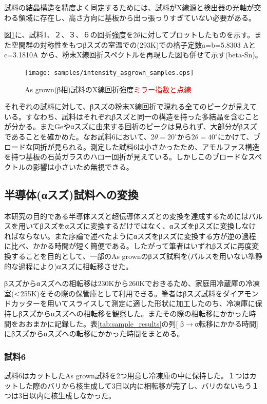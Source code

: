 試料の結晶構造を精度よく同定するためには、試料がX線源と検出器の光軸が交わる領域に存在し、高さ方向に基板から出っ張っりすぎていない必要がある。

図\ref{fig:intensity_asgrown_samples}に、試料1、２、３、６の回折強度を$2\theta$に対してプロットしたものを示す。また空間群の対称性をもつβスズの室温での(293K)での格子定数a=b=5.8303 Aとc=3.1810A \cite{Wolcyrz}から、粉末X線回折スペクトルを再現した図も併せて示す(beta-Sn)。
\begin{figure}[!h]
    \begin{center}
   \texttt{[image: samples/intensity\_asgrown\_samples.eps]}
  \end{center}
  \caption{As grown(β相)試料のX線回折強度\textcolor{red}{ミラー指数と点線}}
  \label{fig:intensity_asgrown_samples}
\end{figure}

それぞれの試料に対して、βスズの粉末X線回折で現れる全てのピークが見えている。すなわち、試料はそれぞれβスズと同一の構造を持った多結晶を含むことが分かる。またGeやαスズに由来する回折のピークは見られず、大部分がβスズであることを確かめた。なお試料6において、$2\theta=20^\circ$から$2\theta=40^\circ$にかけて、ブロードな回折が見られる。測定した試料6は小さかったため、アモルファス構造を持つ基板の石英ガラスのハロー回折\cite{Speakman}が見えている。しかしこのブロードなスペクトルの影響は小さいため無視できる。

\subsection{半導体(αスズ)試料への変換}
本研究の目的である半導体スズと超伝導体スズとの変換を達成するためにはパルスを用いてβスズをαスズに変換するだけではなく、αスズをβスズに変換しなければならない。また序論で述べたようにαスズをβスズに変換する方が逆の過程に比べ、かかる時間が短く簡便である。したがって筆者はいずれβスズに再度変換することを目的として、一部のAs grownのβスズ試料を(パルスを用いない準静的な過程により)αスズに相転移させた。

βスズからαスズへの相転移は230Kから260Kでおきる\cite{Matvienko,Ogino,Cornelius}ため、家庭用冷蔵庫の冷凍室($\rm<$255K)をその際の保管庫として利用できる。筆者はβスズ試料をダイアモンドカッターを用いてスライスして測定に適した形状に加工したのち、冷凍庫に保持しβスズからαスズへの相転移を観察した。またその際の相転移にかかった時間をおおまかに記録した。表\ref{tab:sample_results}の列[ β$\to$α転移にかかる時間] にβスズからαスズへの転移にかかった時間をまとめる。

\subsubsection{試料6}
試料6はカットしたAs grown試料を2つ用意し冷凍庫の中に保持した。１つはカットした際のバリから核生成して3日以内に相転移が完了し、バリのないもう１つは3日以内に核生成しなかった。

